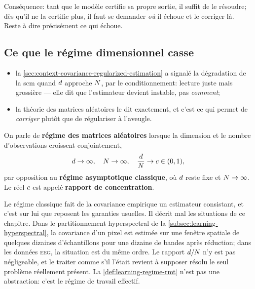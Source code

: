 Conséquence: tant que le modèle certifie sa propre sortie, il suffit de le
résoudre; dès qu'il ne la certifie plus, il faut se demander \emph{où} il
échoue et le corriger là. Reste à dire précisément ce qui échoue.

\subsection{Ce que le régime dimensionnel casse}
\label{subsec:learning-rmt}


\begin{itemize}
  \item la \cref{sec:context-covariance-regularized-estimation} a signalé la
    dégradation de la scm quand $d$ approche $N$, par le
    conditionnement: lecture juste mais grossière --- elle dit que l'estimateur
    devient instable, pas \emph{comment};
  \item la théorie des matrices aléatoires le dit exactement, et c'est ce qui
    permet de \emph{corriger} plutôt que de régulariser à l'aveugle.
\end{itemize}

\begin{definition}
\label{def:learning-regime-rmt}
  On parle de \textbf{régime des matrices aléatoires} lorsque la dimension et
  le nombre d'observations croissent conjointement,
  \begin{equation}
    d\to\infty,
    \quad
    N\to\infty,
    \quad
    \frac{d}{N}\to c\in(0,1),
    \label{eq:learning-regime-rmt}
  \end{equation}
  par opposition au \textbf{régime asymptotique classique}, où $d$ reste
  fixe et $N\to\infty$. Le réel $c$ est appelé \textbf{rapport de
  concentration}.
\end{definition}

\begin{remark}
\label{rem:learning-pourquoi-regime}
  Le régime classique fait de la covariance empirique un estimateur consistant,
  et c'est sur lui que reposent les garanties usuelles. Il décrit mal les
  situations de ce chapitre. Dans le partitionnement hyperspectral de la
  \cref{subsec:learning-hyperspectral}, la covariance d'un pixel est estimée
  sur une fenêtre spatiale de quelques dizaines d'échantillons pour une
  dizaine de bandes après réduction; dans les données \textsc{eeg}, la
  situation est du même ordre. Le rapport $d/N$ n'y est pas
  négligeable, et le traiter comme s'il l'était revient à supposer résolu le
  seul problème réellement présent. La \cref{def:learning-regime-rmt} n'est pas
  une abstraction: c'est le régime de travail effectif.
\end{remark}


